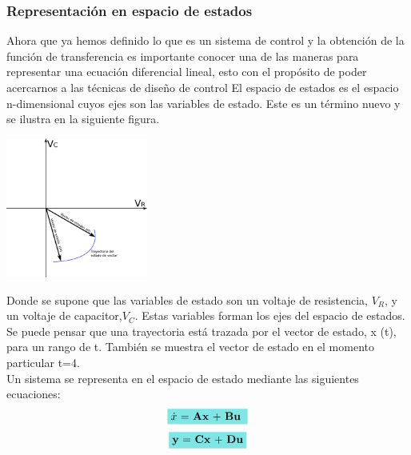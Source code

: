 \subsubsection{Representación en espacio de estados}
Ahora que ya hemos definido lo que es un sistema de control y la obtención de la función de transferencia es importante conocer una de las
maneras para representar una ecuación diferencial lineal, esto con el propósito de poder acercarnos a las técnicas de diseño de control
El espacio de estados es el espacio n-dimensional cuyos ejes son las variables de estado. Este es un término nuevo y se ilustra en la
siguiente figura.
\begin{center}
	\includegraphics[width=0.35\textwidth]{Contenido/Cuerpo/Capitulo2/Fig25.eps}
	\label{fig:MarcoTeorico:Fig25}
\end{center}
Donde se supone que las variables de estado son un voltaje de resistencia, $V_R$, y un voltaje de capacitor,$V_C$. Estas variables forman los
ejes del espacio de estados. Se puede pensar que una trayectoria está trazada por el vector de estado, x (t), para un rango de t. También se
muestra el vector de estado en el momento particular t=4.\\
Un sistema se representa en el espacio de estado mediante las siguientes ecuaciones:
\begin{equation}
	\colorbox[rgb]{0.5,0.9,0.9}{\textbf{$\dot{x}$} = \textbf{Ax} + \textbf{Bu} }
\end{equation}
\begin{equation}
	\colorbox[rgb]{0.5,0.9,0.9}{\textbf{y} = \textbf{Cx} + \textbf{Du}}
\end{equation}


